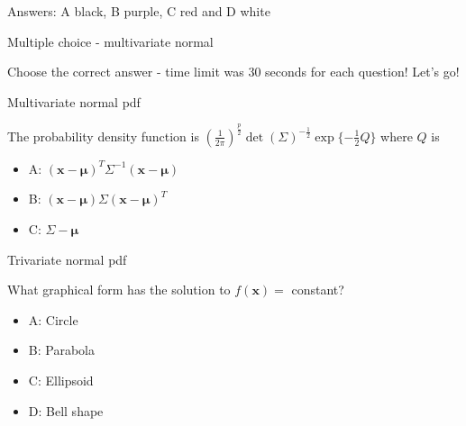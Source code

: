 \documentclass[ignorenonframetext,]{beamer}
\providecommand{\tightlist}{%
  \setlength{\itemsep}{0pt}\setlength{\parskip}{0pt}}
\begin{document}
\begin{frame}

Answers: A black, B purple, C red and D white

\begin{block}{Multiple choice - multivariate normal}

Choose the correct answer - time limit was 30 seconds for each question!
Let's go!

\begin{block}{Multivariate normal pdf}

The probability density function is
\((\frac{1}{2\pi})^\frac{p}{2}\det(\Sigma)^{-\frac{1}{2}}\exp\{-\frac{1}{2}Q\}\)
where \(Q\) is

\begin{itemize}
\tightlist
\item
  A: \((\mathbf{x}-\mathbf{\mu})^T\Sigma^{-1}(\mathbf{x}-\mathbf{\mu})\)
\item
  B: \((\mathbf{x}-\mathbf{\mu})\Sigma(\mathbf{x}-\mathbf{\mu})^T\)
\item
  C: \(\Sigma-\mathbf{\mu}\)
\end{itemize}

\end{block}

\end{block}

\end{frame}

\begin{frame}

\begin{block}{Trivariate normal pdf}

What graphical form has the solution to \(f(\mathbf{x})=\) constant?

\begin{itemize}
\tightlist
\item
  A: Circle
\item
  B: Parabola
\item
  C: Ellipsoid
\item
  D: Bell shape
\end{itemize}

\end{block}

\end{frame}
\end{document}
